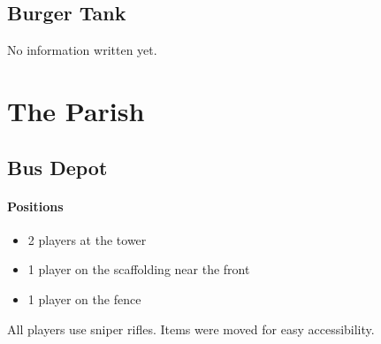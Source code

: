 \subsection{Burger Tank}
No information written yet.

\section{The Parish}

\subsection{Bus Depot}


\paragraph{Positions}
\begin{itemize}
\item 2 players at the tower
\item 1 player on the scaffolding near the front
\item 1 player on the fence
\end{itemize}
All players use sniper rifles. Items were moved for easy accessibility.


